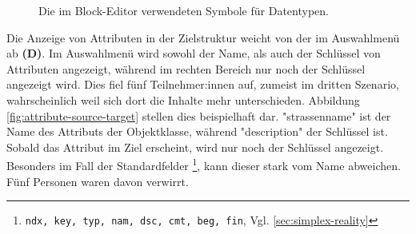 \begin{figure}
  \centering
  \caption[Die im Block-Editor verwendeten Symbole für Datentypen]{Die im Block-Editor verwendeten Symbole für Datentypen. \\}
  \label{fig:icons}
\end{figure}

Die Anzeige von Attributen in der Zielstruktur weicht von der im Auswahlmenü ab \textbf{(D)}. Im Auswahlmenü wird sowohl der Name, als auch der Schlüssel von Attributen angezeigt, während im rechten Bereich nur noch der Schlüssel angezeigt wird. Dies fiel fünf Teilnehmer:innen auf, zumeist im dritten Szenario, wahrscheinlich weil sich dort die Inhalte mehr unterschieden. Abbildung \ref{fig:attribute-source-target} stellen dies beispielhaft dar. "strassenname" ist der Name des Attributs der Objektklasse, während "description" der Schlüssel ist. Sobald das Attribut im Ziel erscheint, wird nur noch der Schlüssel angezeigt. Besonders im Fall der Standardfelder \footnote{\texttt{ndx, key, typ, nam, dsc, cmt, beg, fin}, Vgl. \ref{sec:simplex-reality}}, kann dieser stark vom Name abweichen. Fünf Personen waren davon verwirrt.

